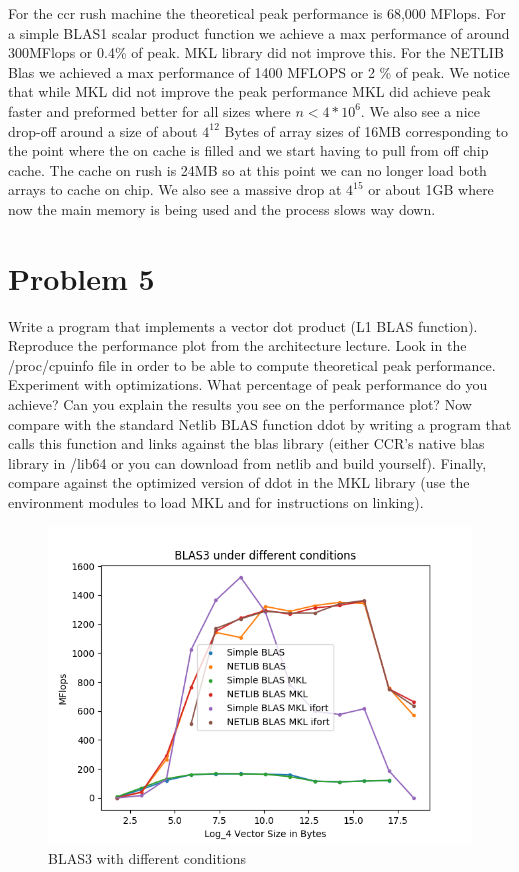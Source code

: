 \documentclass[12pt]{article}
\theoremstyle{plain}
\theoremstyle{definition}
\begin{document}
For the ccr rush machine the theoretical peak performance is 68,000 MFlops. For a simple BLAS1 scalar product function we achieve a max performance of around 300MFlops or 0.4\% of peak. MKL library did not improve this. For the NETLIB Blas we achieved a max performance of 1400 MFLOPS or 2 \% of peak. We notice that while MKL did not improve the peak performance MKL did achieve peak faster and preformed better for all sizes where $n < 4 *10^6$. We also see a nice drop-off around a size of about $4^{12}$ Bytes of array sizes of 16MB corresponding to the point where the on cache is filled and we start having to pull from off chip cache. The cache on rush is 24MB so at this point we can no longer load both arrays to cache on chip. We also see a massive drop at $4^{15}$ or about 1GB where now the main memory is being used and the process slows way down.

\section*{Problem 5}
Write a program that implements a vector dot product (L1 BLAS function). Reproduce
the performance plot from the architecture lecture. Look in the /proc/cpuinfo file in
order to be able to compute theoretical peak performance. Experiment with optimizations.
What percentage of peak performance do you achieve? Can you explain the results
you see on the performance plot?
Now compare with the standard Netlib BLAS function ddot by writing a program that
calls this function and links against the blas library (either CCR’s native blas library in
/lib64 or you can download from netlib and build yourself).
Finally, compare against the optimized version of ddot in the MKL library (use the
environment modules to load MKL and for instructions on linking).

\begin{figure}  
\label{fig:problem5}
\includegraphics[scale=0.7]{problem5.png}
\caption{BLAS3 with different conditions}
\end{figure}
\end{document}
